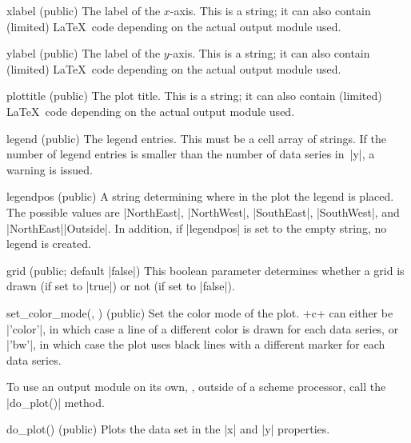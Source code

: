 \begin{property}{xlabel (public)}
  The label of the $x$-axis. This is a string; it can
  also contain (limited) \LaTeX\ code depending on the actual output module
  used. 
\end{property}
\begin{property}{ylabel (public)}
  The label of the $y$-axis. This is a string; it can
  also contain (limited) \LaTeX\ code depending on the actual output module
  used.
\end{property}

\begin{property}{plottitle (public)}
  The plot title. This is a string; it can also
  contain (limited) \LaTeX\ code depending on the actual output module used.
\end{property}

\begin{property}{legend (public)}
  The legend entries. This must be a cell array of
  strings. If the number of legend entries is smaller than the number of data
  series in~|y|, a warning is issued.
\end{property}

\begin{property}{legendpos (public)}
  A string determining where in the plot the legend is
  placed. The possible values are |NorthEast|, |NorthWest|, |SouthEast|,
  |SouthWest|, and |NorthEast|\-|Outside|. In addition, if |legendpos| is set to
  the empty string, no legend is created.
\end{property}

\begin{property}{grid (public; default |false|)}
  This boolean parameter determines whether a grid is drawn (if set to |true|)
  or not (if set to |false|).
\end{property}

\begin{method}{set_color_mode(\obj, ) (public)}
  Set the color mode of the plot. +c+ can either be |'color'|, in which case a
  line of a different color is drawn for each data series, or |'bw'|, in which
  case the plot uses black lines with a different marker for each data series.
\end{method}

To use an output module on its own, \ie, outside of a scheme processor, call the
|do_plot()| method.
\begin{method}{do_plot(\obj) (public)}
  Plots the data set in the |x| and |y| properties.
\end{method}


